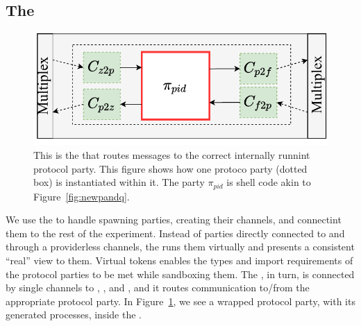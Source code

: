 %

\subsection{The \partywrapper}
\begin{figure}
	\centering
	\includegraphics[scale=0.5]{figures/singleshellmultiplex.pdf}
	\caption{This is the \partywrapper that routes messages to the correct internally runnint protocol party. This figure shows how one protoco party (dotted box) is instantiated within it. The party $\pi_{pid}$ is shell code akin to Figure~\ref{fig:newpandq}.}%
	\label{fig:singlemultiplex}
	\vspace{-3mm}
\end{figure}
We use the \partywrapper to handle spawning parties, creating their channels, and connectint them to the rest of the experiment.
Instead of parties directly connected to \F and \Z through a providerless channels, the \partywrapper runs them virtually and presents a consistent ``real'' view to them. 
Virtual tokens enables the types and import requirements of the protocol parties to be met while sandboxing them. 
The \partywrapper, in turn, is connected by single channels to \F, \Z, and \A, and it routes communication to/from the appropriate protocol party. 
In Figure~\ref{fig:singlemultiplex}, we see a wrapped protocol party, with its generated processes, inside the \partywrapper. 

